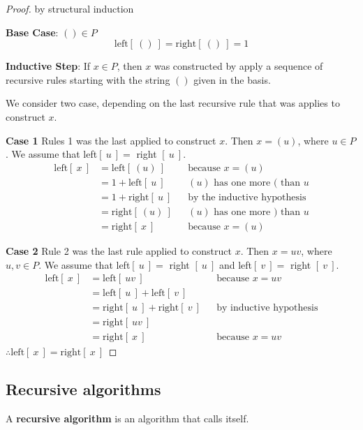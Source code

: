 \begin{proof}
  by structural induction

  \textbf{Base Case}: $() \in P$
  \[
    \text{left}[~()~] = \text{right}[~()~] = 1
  \]

  \textbf{Inductive Step}: If $x\in P$, then $x$ was constructed by apply a sequence
  of recursive rules starting with the string $()$ given in the basis.

  We consider two case, depending on the last recursive rule that was applies to construct $x$.

  \textbf{Case 1} Rules 1 was the last applied to construct $x$.
  Then $x = (u)$, where $u\in P$. We assume that left$[~u~] =$ right $[~u~]$.
  \begin{align*}
    \text{left}[~x~] & = \text{left}[~(u)~]    &  & \text{because $x = (u)$}               \\
                     & = 1 + \text{left}[~u~]  &  & \text{$(u)$ has one more $($ than $u$} \\
                     & = 1 + \text{right}[~u~] &  & \text{by the inductive hypothesis}     \\
                     & = \text{right}[~(u)~]   &  & \text{$(u)$ has one more $)$ than $u$} \\
                     & = \text{right}[~x~]     &  & \text{because $x = (u)$}
  \end{align*}

  \textbf{Case 2} Rule 2 was the last rule applied to construct $x$.
  Then $x=uv$, where $u,v\in P$. We assume that left$[~u~] =$ right $[~u~]$ and left$[~v~] =$ right $[~v~]$.
  \begin{align*}
    \text{left}[~x~] & = \text{left}[~uv~]                     &  & \text{because $x=uv$}          \\
                     & = \text{left}[~u~] + \text{left}[~v~]                                       \\
                     & = \text{right}[~u~] + \text{right}[~v~] &  & \text{by inductive hypothesis} \\
                     & = \text{right}[~uv~]                                                        \\
                     & = \text{right}[~x~]                     &  & \text{because $x=uv$}
  \end{align*}
  $\therefore \text{left}[~x~] = \text{right}[~x~]$
\end{proof}

\subsection{Recursive algorithms}
A \textbf{recursive algorithm} is an algorithm that calls itself.

